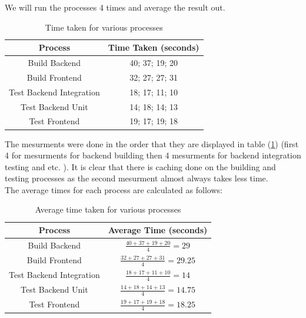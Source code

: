 \documentclass[]{VUMIFTemplateClass}
\begin{document}
We will run the processes 4 times and average the result out.

\begin{table}[H]
    \centering
    \begin{tabular}{|c|c|}
        \hline
        \textbf{Process} & \textbf{Time Taken (seconds)} \\
        \hline
        Build Backend & 40; 37; 19; 20  \\
        \hline
        Build Frontend & 32; 27; 27; 31  \\
        \hline
        Test Backend Integration & 18; 17; 11; 10 \\
        \hline
        Test Backend Unit & 14; 18; 14; 13  \\
        \hline
        Test Frontend & 19; 17; 19; 18 \\
        \hline
    \end{tabular}
    \caption{Time taken for various processes}
    \label{tab:process-time}
\end{table}

The mesurments were done in the order that they are displayed in table (\ref{tab:process-time}) (first 4 for mesurments for backend building then 4 mesurments for backend integration testing and etc. ). 
It is clear that there is caching done on the building and testing processes as the second mesurment almost always takes less time.\\

The average times for each process are calculated as follows:

\begin{table}[H]
    \centering
    \begin{tabular}{|c|c|}
        \hline
        \textbf{Process} & \textbf{Average Time (seconds)} \\
        \hline
        Build Backend & \(\frac{40 + 37 + 19 + 20}{4} = 29\) \\
        \hline
        Build Frontend & \(\frac{32 + 27 + 27 + 31}{4} = 29.25\) \\
        \hline
        Test Backend Integration & \(\frac{18 + 17 + 11 + 10}{4} = 14\) \\
        \hline
        Test Backend Unit & \(\frac{14 + 18 + 14 + 13}{4} = 14.75\) \\
        \hline
        Test Frontend & \(\frac{19 + 17 + 19 + 18}{4} = 18.25\) \\
        \hline
    \end{tabular}
    \caption{Average time taken for various processes}
    \label{tab:average-process-time}
\end{table}
\end{document}
